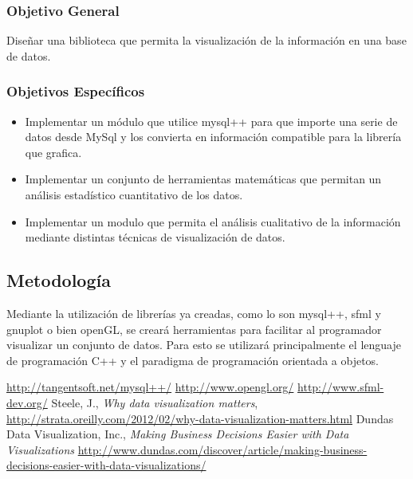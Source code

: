 \documentclass[11pt]{article}
\begin{document}
\subsubsection*{Objetivo General}
Diseñar una biblioteca que permita la visualización de la información en una base de datos.

\subsubsection*{Objetivos Específicos}
\begin{itemize}
\item Implementar un módulo que utilice mysql++ para que importe una serie de datos desde MySql 
      y los convierta en información compatible para la librería que grafica.
\item Implementar un conjunto de herramientas matemáticas que permitan un análisis
	  estadístico cuantitativo de los datos.
\item Implementar un modulo que permita el análisis cualitativo de la información mediante 
	  distintas técnicas de visualización de datos.
\end{itemize}

\subsection*{Metodología}
Mediante la utilización de librerías ya creadas, como lo son mysql++, sfml 
y gnuplot o bien openGL, se creará herramientas para facilitar al programador 
visualizar un conjunto de datos. Para esto se utilizará principalmente el
lenguaje de programación C++ y el paradigma de programación orientada a objetos.

\begin{thebibliography}{10}
\url{http://tangentsoft.net/mysql++/}
\url{http://www.opengl.org/}
\url{http://www.sfml-dev.org/}
Steele, J., \textit{Why data visualization matters}, 
		\url{http://strata.oreilly.com/2012/02/why-data-visualization-matters.html}
Dundas Data Visualization, Inc., \textit{Making Business Decisions Easier with Data Visualizations}
		\url{http://www.dundas.com/discover/article/making-business-decisions-easier-with-data-visualizations/}
\end{thebibliography}
\end{document}
